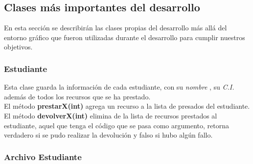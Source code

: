\documentclass[12pt]{article}
\begin{document}
\subsection{Clases más importantes del desarrollo}
En esta sección se describirán las clases propias del desarrollo más allá del entorno gráfico que fueron utilizadas durante el desarrollo para cumplir nuestros objetivos.
\subsubsection{Estudiante}
\begin{center}

\end{center}
Esta clase guarda la información de cada estudiante, con su \textit{nombre} , su \textit{C.I.}  además de todos los recursos que se ha prestado.  \\ 
El método \textbf{prestarX(int)} agrega un recurso a la lista de presados del estudiante.  El método \textbf{devolverX(int)} elimina de la lista de recursos prestados al estudiante, aquel que tenga el código que se pasa como argumento, retorna verdadero si se pudo realizar la devolución y falso si hubo algún fallo.  

\subsubsection{Archivo Estudiante}
\begin{center}
\end{center}
\end{document}
